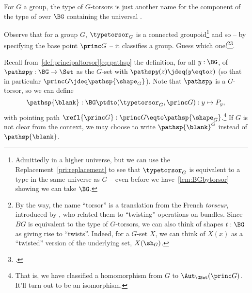 \begin{remark}
  For $G$ a group, the type of $G$-torsors is just another name for the component of the type of \coverings over $\BG$ containing the universal \covering.

  Observe that for a group $G$, $\typetorsor_G$ is a connected groupoid\footnote{Admittedly in a higher universe, but we can use the
    Replacement~\cref{pri:replacement} to see that $\typetorsor_G$ is equivalent
    to a type in the same universe as $G$ -- even before we
    have~\cref{lem:BGbytorsor} showing we can take $\BG$.}
  and so -- by specifying the base point $\princ G$ -- it classifies a group.
  Guess which one!\footnote{%
    By the way, the name ``torsor'' is a translation from the French \emph{torseur},
    introduced by \citeauthor{giraud1971},\footnotemark{} who
    related them to “twisting” operations on bundles.
    Since $BG$ is equivalent to the type of $G$-torsors,
    we can also think of shapes $t:\BG$ as giving rise to “twists”.
    Indeed, for a $G$-set $X$,
    we can think of $X(x)$ as a ``twisted'' version of the underlying set,
    $X(\sh_G)$.}\footcitetext{giraud1971}.
\end{remark}


\begin{definition}
  \label{def:BG2TorsG}
Recall from~\cref{def:principaltorsor}\eqref{eq:pathsp}
the definition, for all $y:\BG$, of $\pathsp y:\BG\to\Set$
as the $G$-set with $\pathsp y(z)\jdeq(y\eqto z)$
(so that in particular $\princ G\jdeq\pathsp{\shape_G}$).
Note that $\pathsp y$ is a $G$-torsor, so we can define
  \[
    \pathsp{\blank}:\BG\ptdto(\typetorsor_G,\princ G): y\mapsto P_y,
  \]
  with pointing path $\refl{\princ G}:\princ G\eqto\pathsp{\shape_G}$.\footnote{%
    That is, we have classified a homomorphism from $G$
    to $\Aut_{\GSet}(\princ G)$. It'll turn out to be an isomorphism.}
If $G$ is not clear from the context, we may choose to write $\pathsp{\blank}^G$ instead of $\pathsp{\blank}$.
\end{definition}

